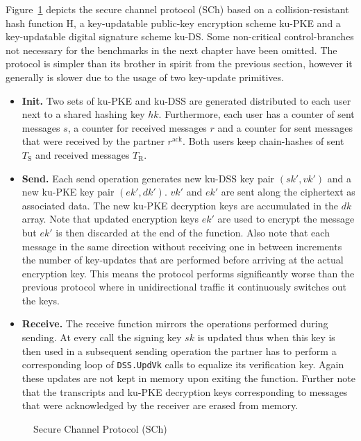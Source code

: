 \documentclass[11pt,a4paper,twoside,openright,bibliography=totoc]{scrbook}
\renewcommand{\t}{\text} %
\begin{document}
Figure~\ref{fig:secure-channel} depicts the secure channel
protocol (SCh) based on a collision-resistant
hash function H, a key-updatable public-key encryption scheme ku-PKE and
a key-updatable digital signature scheme ku-DS. Some non-critical
control-branches not necessary for the benchmarks in the next chapter
have been omitted. The protocol is simpler than
its brother in spirit from the previous section, however it
generally is slower due to the usage of two key-update primitives.
\begin{itemize}
\item \textbf{Init.} Two sets of ku-PKE and ku-DSS are generated
  distributed to each user next to a shared hashing key $hk$. Furthermore,
  each user has a counter of sent messages $s$, a counter for received messages
  $r$ and a counter for sent messages that were received by the partner
  $r^\t{ack}$. Both users keep chain-hashes of sent $T_\t{S}$ and received
  messages $T_\t{R}$.
\item \textbf{Send.} Each send operation generates new ku-DSS key pair
  $(sk',vk')$ and a new ku-PKE key pair $(ek',dk')$. $vk'$ and $ek'$ are sent
  along the ciphertext as associated data. The new ku-PKE decryption keys
  are accumulated in the $dk$ array. Note that updated encryption keys $ek'$
  are used to encrypt the message but $ek'$ is then discarded at the end of
  the function. Also note that each message in the same direction
  without receiving one in between increments the number of key-updates
  that are performed before arriving at the actual encryption key. This
  means the protocol performs significantly worse than the previous
  protocol where in unidirectional traffic it continuously switches
  out the keys.
\item \textbf{Receive.} The receive function mirrors the operations
  performed during sending. At every call the signing key $sk$ is updated
  thus when this key is then used in a subsequent sending operation the
  partner has to perform a corresponding loop of \texttt{DSS.UpdVk}
  calls to equalize its verification key. Again these updates
  are not kept in memory upon exiting the function. Further note
  that the transcripts and ku-PKE decryption keys corresponding to messages
  that were acknowledged by the receiver are erased from memory.
\end{itemize}

\begin{figure}[p]
  \centering
  \setlength{\fboxsep}{10pt}
  \scalebox{0.9}{%
    \fbox{%
      
    }
  }
  \caption{Secure Channel Protocol (SCh)}
  \label{fig:secure-channel}
\end{figure}
\end{document}
